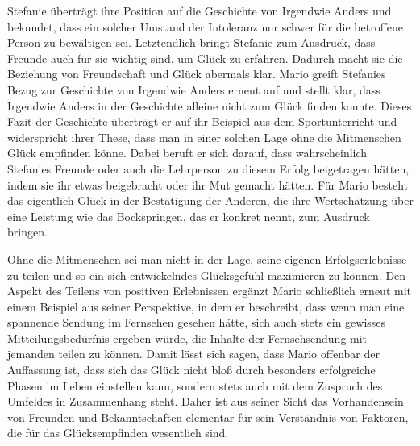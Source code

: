 Stefanie überträgt ihre Position auf die Geschichte von Irgendwie Anders und bekundet, dass ein solcher Umstand der Intoleranz nur schwer für die betroffene Person zu bewältigen sei. 
Letztendlich bringt Stefanie zum Ausdruck, dass Freunde auch für sie wichtig sind, um Glück zu erfahren. 
Dadurch macht sie die Beziehung von Freundschaft und Glück abermals klar.
Mario greift Stefanies Bezug zur Geschichte von Irgendwie Anders erneut auf und stellt klar, dass Irgendwie Anders in der Geschichte alleine nicht zum Glück finden konnte. 
Dieses Fazit der Geschichte überträgt er auf ihr Beispiel aus dem Sportunterricht und widerspricht ihrer These, dass man in einer solchen Lage ohne die Mitmenschen Glück empfinden könne. 
Dabei beruft er sich darauf, dass wahrscheinlich Stefanies Freunde oder auch die Lehrperson zu diesem Erfolg beigetragen hätten, indem sie ihr etwas beigebracht oder ihr Mut gemacht hätten. 
Für Mario besteht das eigentlich Glück in der Bestätigung der Anderen, die ihre Wertschätzung über eine Leistung wie das Bockspringen, das er konkret nennt, zum Ausdruck bringen. 

Ohne die Mitmenschen sei man nicht in der Lage, seine eigenen Erfolgserlebnisse zu teilen und so ein sich entwickelndes Glücksgefühl maximieren zu können. 
Den Aspekt des Teilens von positiven Erlebnissen ergänzt Mario schließlich erneut mit einem Beispiel aus seiner Perspektive, in dem er beschreibt, dass wenn man eine spannende Sendung im Fernsehen gesehen hätte, sich auch stets ein gewisses Mitteilungsbedürfnis ergeben würde, die Inhalte der Fernsehsendung mit jemanden teilen zu können. 
Damit lässt sich sagen, dass Mario offenbar der Auffassung ist, dass sich das Glück nicht bloß durch besonders erfolgreiche Phasen im Leben einstellen kann, sondern stets auch mit dem Zuspruch des Umfeldes in Zusammenhang steht. 
Daher ist aus seiner Sicht das Vorhandensein von Freunden und Bekanntschaften elementar für sein Verständnis von Faktoren, die für das Glücksempfinden wesentlich sind.

